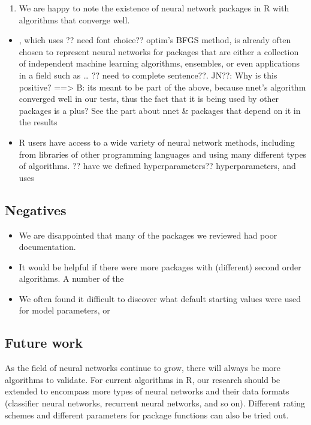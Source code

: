 \begin{enumerate}
\def\labelenumi{\arabic{enumi}.}
\tightlist
\item
  We are happy to note the existence of neural network packages in R
  with algorithms that converge well.
\end{enumerate}

\begin{itemize}
\tightlist
\item
  , which uses ?? need font choice?? optim's BFGS method, is
  already often chosen to represent neural networks for packages that
  are either a collection of independent machine learning algorithms,
  ensembles, or even applications in a field such as \ldots{} ?? need to
  complete sentence??. JN??: Why is this positive? ==\textgreater{} B:
  its meant to be part of the above, because nnet's algorithm converged
  well in our tests, thus the fact that it is being used by other
  packages is a plus? See the part about nnet \& packages that depend on
  it in the results
\item
  R users have access to a wide variety of neural network methods,
  including from libraries of other programming languages and using many
  different types of algorithms. ?? have we defined hyperparameters??
  hyperparameters, and uses
\end{itemize}

\hypertarget{negatives}{%
\subsection{Negatives}\label{negatives}}

\begin{itemize}
\tightlist
\item
  We are disappointed that many of the packages we reviewed had poor
  documentation.
\item
  It would be helpful if there were more packages with (different)
  second order algorithms. A number of the
\item
  We often found it difficult to discover what default starting values
  were used for model parameters, or
\end{itemize}

\hypertarget{future-work}{%
\subsection{Future work}\label{future-work}}

As the field of neural networks continue to grow, there will always be
more algorithms to validate. For current algorithms in R, our research
should be extended to encompass more types of neural networks and their
data formats (classifier neural networks, recurrent neural networks, and
so on). Different rating schemes and different parameters for package
functions can also be tried out.

